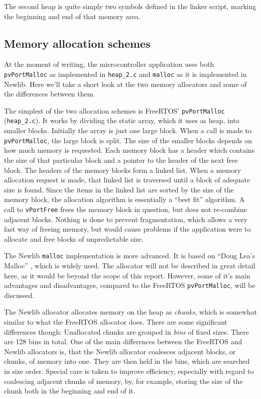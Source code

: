 The second heap is quite simply two symbols defined in the linker script, marking the beginning and end of that memory area.


\subsection{Memory allocation schemes}
At the moment of writing, the microcontroller application uses both \texttt{pvPortMalloc} as implemented in \texttt{heap\_2.c} and \texttt{malloc} as it is implemented in Newlib. Here we'll take a short look at the two memory allocators and some of the differences between them.

The simplest of the two allocation schemes is FreeRTOS' \texttt{pvPortMalloc} (\texttt{heap\_2.c}). It works by dividing the static array, which it uses as heap, into smaller blocks. Initially the array is just one large block. When a call is made to \texttt{pvPortMalloc}, the large block is split. The size of the smaller blocks depends on how much memory is requested. Each memory block has a header which contains the size of that particular block and a pointer to the header of the next free block. The headers of the memory blocks form a linked list. When a memory allocation request is made, that linked list is traversed until a block of adequate size is found. Since the items in the linked list are sorted by the size of the memory block, the allocation algorithm is essentially a ``best fit'' algorithm. A call to \texttt{vPortFree} frees the memory block in question, but does not re-combine adjacent blocks. Nothing is done to prevent fragmentation, which allows a very fast way of freeing memory, but would cause problems if the application were to allocate and free blocks of unpredictable size.

The Newlib \texttt{malloc} implementation is more advanced. It is based on ``Doug Lea's Malloc'' \cite{dlmalloc}, which is widely used. The allocator will not be described in great detail here, as it would be beyond the scope of this report. However, some of it's main advantages and disadvantages, compared to the FreeRTOS \texttt{pvPortMalloc}, will be discussed.

The Newlib allocator allocates memory on the heap as \textit{chunks}, which is somewhat similar to what the FreeRTOS allocator does. There are some significant differences though: Unallocated chunks are grouped in \textit{bins} of fixed sizes. There are 128 bins in total. One of the main differences between the FreeRTOS and Newlib allocators is, that the Newlib allocator coalesces adjacent blocks, or chunks, of memory into one. They are then held in the bins, which are searched in size order. Special care is taken to improve efficiency, especially with regard to coalescing adjacent chunks of memory, by, for example, storing the size of the chunk both in the beginning and end of it.

